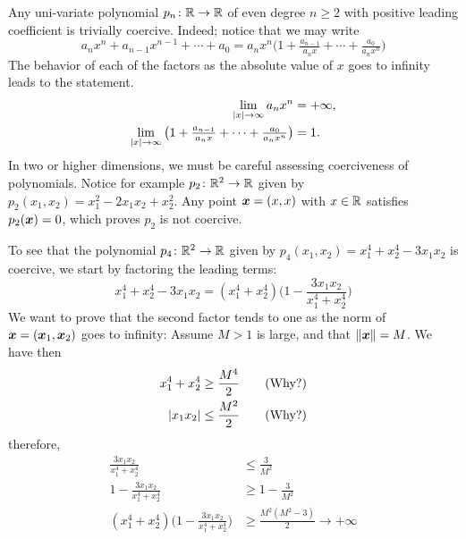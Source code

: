 \begin{example}\label{example:CoerciveFunctions}
Any uni-variate polynomial $p_n \colon \mathbb{R} \to \mathbb{R}$ of even degree $n \geq 2$ with positive leading coefficient is trivially coercive.  Indeed; notice that we may write
\begin{equation*}
a_n x^n + a_{n-1} x^{n-1} + \dotsb + a_0 = a_n x^n \big( 1 + \tfrac{a_{n-1}}{a_n x} + \dotsb + \tfrac{a_0}{a_n x^n} \big)
\end{equation*}
The behavior of each of the factors as the absolute value of $x$ goes to infinity leads to the statement.
\begin{align*}
\lim_{\lvert x \rvert \to \infty} a_n x^n &= +\infty, \\
\lim_{\lvert x \rvert \to \infty} \big( 1 + \tfrac{a_{n-1}}{a_n x} + \dotsb + \tfrac{a_0}{a_n x^n} \big) &= 1.
\end{align*}
In two or higher dimensions, we must be careful assessing coerciveness of polynomials. Notice for example $p_2 \colon \mathbb{R}^2 \to \mathbb{R}$ given by $p_2(x_1,x_2) = x_1^2 - 2x_1x_2 + x_2^2$.  Any point $\boldsymbol{x} = (x,x)$ with $x \in \mathbb{R}$ satisfies $p_2(\boldsymbol{x})=0$, which proves $p_2$ is not coercive.

To see that the polynomial $p_4 \colon \mathbb{R}^2 \to \mathbb{R}$ given by $p_4(x_1, x_2) = x_1^4 + x_2^4 - 3x_1x_2$ is coercive, we start by factoring the leading terms:
\begin{equation*}
x_1^4 + x_2^4 - 3x_1x_2 = (x_1^4 + x_2^4) \big( 1 - \frac{3x_1x_2}{x_1^4 + x_2^4} \big)
\end{equation*}
We want to prove that the second factor tends to one as the norm of $\boldsymbol{x}=(\boldsymbol{x}_1, \boldsymbol{x}_2)$ goes to infinity:
Assume $M>1$ is large, and that $\lVert \boldsymbol{x} \rVert = M$.  We have then
\begin{align*}
x_1^4 + x_2^4 &\geq \frac{M^4}{2} \qquad\text{(Why?)} \\
 \lvert x_1 x_2 \rvert &\leq \frac{M^2}{2} \qquad\text{(Why?)}
\end{align*}
therefore, 
\begin{align*}
\frac{3x_1x_2}{x_1^4 + x_2^4} &\leq \frac{3}{M^2} \\
1 - \frac{3x_1x_2}{x_1^4 + x_2^4} &\geq 1 - \frac{3}{M^2} \\
(x_1^4 + x_2^4) \bigg( 1 - \frac{3x_1 x_2}{x_1^4 + x_2^4} \bigg) &\geq \frac{M^2(M^2-3)}{2} \to +\infty
\end{align*} 
\end{example}

